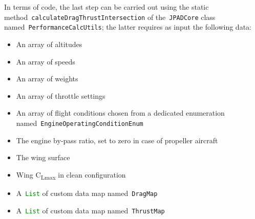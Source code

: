In terms of code, the last step can be carried out using the static method~\lstinline[language=Java]!calculateDragThrustIntersection! of the~\lstinline[language=Java]!JPADCore! class named~\lstinline[language=Java]!PerformanceCalcUtils!; the latter requires as input the following data:

\begin{itemize}
\item An array of altitudes
\item An array of speeds
\item An array of weights
\item An array of throttle settings
\item An array of flight conditions chosen from a dedicated enumeration named~\lstinline[language=Java]!EngineOperatingConditionEnum!
\item The engine by-pass ratio, set to zero in case of propeller aircraft
\item The wing surface
\item Wing C\textsubscript{Lmax} in clean configuration
\item A~\lstinline[language=Java]!List! of custom data map named~\lstinline[language=Java]!DragMap!
\item A~\lstinline[language=Java]!List! of custom data map named~\lstinline[language=Java]!ThrustMap!
\end{itemize}


